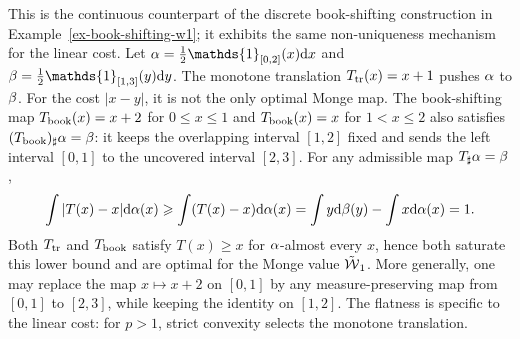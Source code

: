 \begin{example}\label{ex-monge-book-shifting-w1}
	This is the continuous counterpart of the discrete book-shifting construction in Example~\ref{ex-book-shifting-w1}; it exhibits the same non-uniqueness mechanism for the linear cost.
	Let $\al=\frac12\mathds{1}_{[0,2]}(x)\d x$ and
	$\be=\frac12\mathds{1}_{[1,3]}(y)\d y$.
	The monotone translation $T_{\rm tr}(x)=x+1$ pushes $\alpha$ to $\beta$. For the cost $|x-y|$, it is not the only optimal Monge map. The book-shifting map
	$T_{\rm book}(x)=x+2$ for $0\leq x\leq1$ and
	$T_{\rm book}(x)=x$ for $1<x\leq2$ also satisfies
	$(T_{\rm book})_\sharp\alpha=\beta$: it keeps the overlapping interval $[1,2]$ fixed and sends the left interval $[0,1]$ to the uncovered interval $[2,3]$. For any admissible map $T_\sharp\alpha=\beta$,
	\[
		\int |T(x)-x|\mathrm{d}\alpha(x)
		\geqslant
		\int (T(x)-x)\mathrm{d}\alpha(x)
		=
		\int y\mathrm{d}\beta(y)-\int x\mathrm{d}\alpha(x)
		=1.
	\]
	Both $T_{\rm tr}$ and $T_{\rm book}$ satisfy $T(x)\geq x$ for $\alpha$-almost every $x$, hence both saturate this lower bound and are optimal for the Monge value $\tilde{\operatorname{\mathcal{W}}}_1$. More generally, one may replace the map $x\mapsto x+2$ on $[0,1]$ by any measure-preserving map from $[0,1]$ to $[2,3]$, while keeping the identity on $[1,2]$. The flatness is specific to the linear cost: for $p>1$, strict convexity selects the monotone translation.
\end{example}

